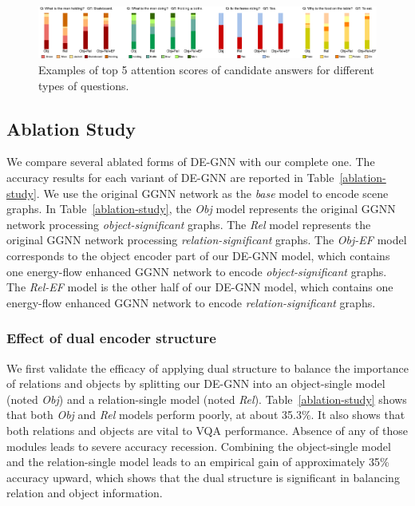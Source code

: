 \documentclass[letterpaper]{article} %
\begin{document}
\begin{figure}[ht] 
    \centering 
    \includegraphics[width=1\textwidth]{./pic/visual_detail.pdf} 
    \caption{Examples of top 5 attention scores of candidate answers for different types of questions.} 
    \label{visualbis} 
\end{figure}


\subsection{Ablation Study}
We compare several ablated forms of DE-GNN with our complete one. 
The accuracy results for each variant of DE-GNN are reported in Table~\ref{ablation-study}. 
We use the original GGNN network as the \emph{base} model to encode scene graphs.
In Table~\ref{ablation-study}, the \emph{Obj} model represents the original GGNN network processing \emph{object-significant} graphs. The \emph{Rel} model represents the original GGNN network processing \emph{relation-significant} graphs.
The \emph{Obj-EF} model corresponds to the object encoder part of our DE-GNN model, which contains one energy-flow enhanced GGNN network to encode \emph{object-significant} graphs. 
The \emph{Rel-EF} model is the other half of our DE-GNN model, which contains one energy-flow enhanced GGNN network to encode \emph{relation-significant} graphs.

\subsubsection{Effect of dual encoder structure} We first validate the efficacy of applying dual structure to balance the importance of relations and objects by splitting our DE-GNN into an object-single model (noted \emph{Obj}) and a relation-single model (noted \emph{Rel}). Table~\ref{ablation-study} shows that both \emph{Obj} and \emph{Rel} models perform poorly, at about 35.3\%. 
It also shows that both relations and objects are vital to VQA performance. 
Absence of any of those modules leads to severe accuracy recession. 
Combining the object-single model and the relation-single model leads to an empirical gain of approximately 35\% accuracy upward, which shows that the dual structure is significant in balancing relation and object information. 
\end{document}
